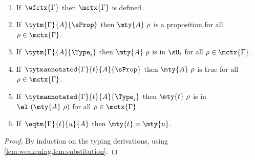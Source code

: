 \begin{theorem}
  \
  \begin{enumerate}
    \item If\, \( \wfctx{\Gamma} \) then \( \mctx{\Gamma} \) is defined.
    \item If\, \( \tytm{\Gamma}{A}{\sProp} \) then \( \mty{A}\ \rho \) is a proposition for all \( \rho \in \mctx{\Gamma} \).
    \item If\, \( \tytm{\Gamma}{A}{\Type_i} \) then \( \mty{A}\ \rho \) is in \( \sU_i \) for all \( \rho \in \mctx{\Gamma} \).
    \item If\, \( \tytmannotated{\Gamma}{t}{A}{\sProp} \) then \( \mty{A}\ \rho \) is true for all \( \rho \in \mctx{\Gamma} \).
    \item If\, \( \tytmannotated{\Gamma}{t}{A}{\Type_i} \) then \( \mty{t}\ \rho \) is in \( \el\ (\mty{A}\ \rho) \) for all \( \rho \in \mctx{\Gamma} \).
    \item If\, \( \eqtm{\Gamma}{t}{u}{A} \) then \( \mty{t} = \mty{u} \).
  \end{enumerate}
\end{theorem}
\begin{proof}
  By induction on the typing derivations, using \cref{lem:weakening,lem:substitution}.
\end{proof}


